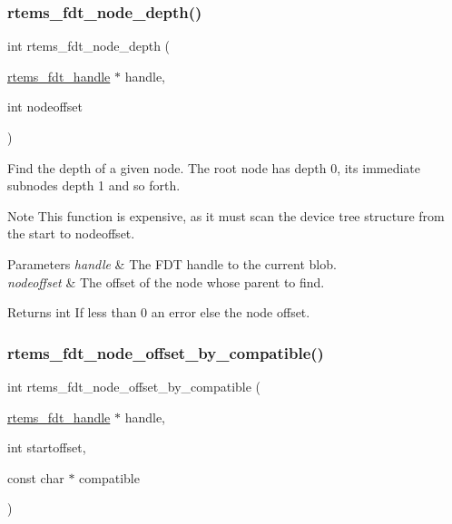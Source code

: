 \subsubsection{\texorpdfstring{rtems\_fdt\_node\_depth()}{rtems\_fdt\_node\_depth()}}
{\footnotesize\ttfamily int rtems\+\_\+fdt\+\_\+node\+\_\+depth (\begin{DoxyParamCaption}\item[{\mbox{\hyperlink{structrtems__fdt__handle}{rtems\+\_\+fdt\+\_\+handle}} $\ast$}]{handle,  }\item[{int}]{nodeoffset }\end{DoxyParamCaption})}

Find the depth of a given node. The root node has depth 0, its immediate subnodes depth 1 and so forth.

\begin{DoxyNote}{Note}
This function is expensive, as it must scan the device tree structure from the start to nodeoffset.
\end{DoxyNote}

\begin{DoxyParams}{Parameters}
{\em handle} & The F\+DT handle to the current blob. \\
\hline
{\em nodeoffset} & The offset of the node whose parent to find. \\
\hline
\end{DoxyParams}
\begin{DoxyReturn}{Returns}
int If less than 0 an error else the node offset. 
\end{DoxyReturn}
\mbox{\label{rtems-fdt_8h_abe269c0fdda9a30c153f87b507c9a1f3}} 
\subsubsection{\texorpdfstring{rtems\_fdt\_node\_offset\_by\_compatible()}{rtems\_fdt\_node\_offset\_by\_compatible()}}
{\footnotesize\ttfamily int rtems\+\_\+fdt\+\_\+node\+\_\+offset\+\_\+by\+\_\+compatible (\begin{DoxyParamCaption}\item[{\mbox{\hyperlink{structrtems__fdt__handle}{rtems\+\_\+fdt\+\_\+handle}} $\ast$}]{handle,  }\item[{int}]{startoffset,  }\item[{const char $\ast$}]{compatible }\end{DoxyParamCaption})}

